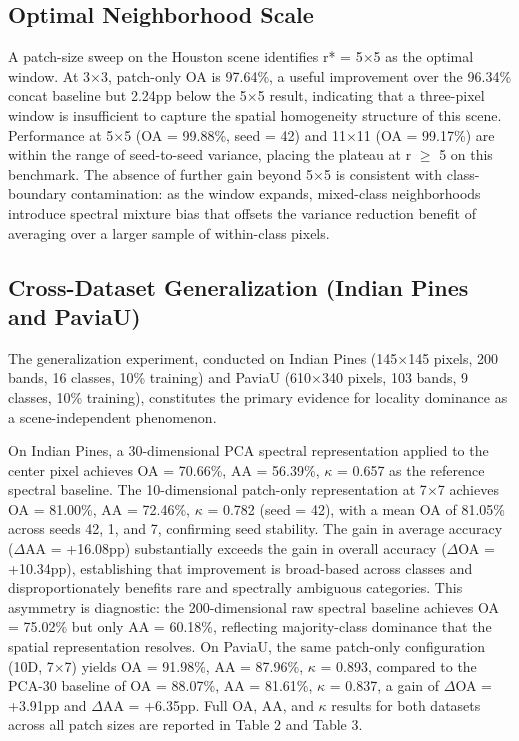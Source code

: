 \documentclass[
  journal]{IEEEtran}
\begin{document}
\subsection{Optimal Neighborhood
Scale}\label{optimal-neighborhood-scale}

A patch-size sweep on the Houston scene identifies r* = 5\(\times\)5 as the
optimal window. At 3\(\times\)3, patch-only OA is 97.64\%, a useful improvement
over the 96.34\% concat baseline but 2.24pp below the 5\(\times\)5 result,
indicating that a three-pixel window is insufficient to capture the
spatial homogeneity structure of this scene. Performance at 5\(\times\)5 (OA =
99.88\%, seed = 42) and 11\(\times\)11 (OA = 99.17\%) are within the range of
seed-to-seed variance, placing the plateau at r \(\geq\) 5 on this benchmark.
The absence of further gain beyond 5\(\times\)5 is consistent with class-boundary
contamination: as the window expands, mixed-class neighborhoods
introduce spectral mixture bias that offsets the variance reduction
benefit of averaging over a larger sample of within-class pixels.

\subsection{Cross-Dataset Generalization (Indian Pines and
PaviaU)}\label{cross-dataset-generalization-indian-pines-and-paviau}

The generalization experiment, conducted on Indian Pines (145\(\times\)145
pixels, 200 bands, 16 classes, 10\% training) and PaviaU (610\(\times\)340
pixels, 103 bands, 9 classes, 10\% training), constitutes the primary
evidence for locality dominance as a scene-independent phenomenon.

On Indian Pines, a 30-dimensional PCA spectral representation applied to
the center pixel achieves OA = 70.66\%, AA = 56.39\%, \(\kappa\) = 0.657 as the
reference spectral baseline. The 10-dimensional patch-only
representation at 7\(\times\)7 achieves OA = 81.00\%, AA = 72.46\%, \(\kappa\) = 0.782
(seed = 42), with a mean OA of 81.05\% across seeds 42, 1, and 7,
confirming seed stability. The gain in average accuracy (\(\Delta\)AA = +16.08pp)
substantially exceeds the gain in overall accuracy (\(\Delta\)OA = +10.34pp),
establishing that improvement is broad-based across classes and
disproportionately benefits rare and spectrally ambiguous categories.
This asymmetry is diagnostic: the 200-dimensional raw spectral baseline
achieves OA = 75.02\% but only AA = 60.18\%, reflecting majority-class
dominance that the spatial representation resolves. On PaviaU, the same
patch-only configuration (10D, 7\(\times\)7) yields OA = 91.98\%, AA = 87.96\%, \(\kappa\)
= 0.893, compared to the PCA-30 baseline of OA = 88.07\%, AA = 81.61\%,
\(\kappa\) = 0.837, a gain of \(\Delta\)OA = +3.91pp and \(\Delta\)AA = +6.35pp. Full OA, AA, and \(\kappa\)
results for both datasets across all patch sizes are reported in Table 2
and Table 3.
\end{document}
